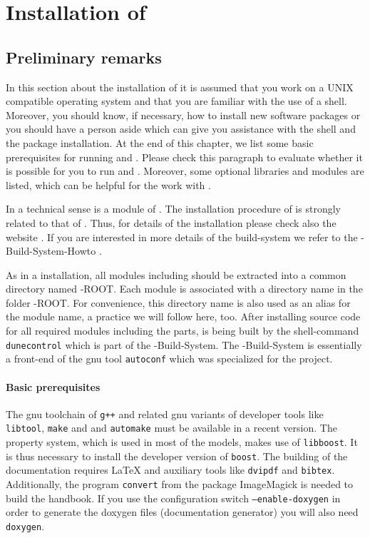 \section{Installation of \Dumux} \label{install}
\subsection{Preliminary remarks}

In this section about the installation of \Dumux it is assumed that you work on a UNIX compatible operating system and that you are familiar with the use of a shell. Moreover, you should know,  if necessary, how to install new software packages or you should have a person aside which can give you assistance with the shell and the package installation. At the end of this chapter, we list some basic prerequisites for running \Dune and \Dumux. Please check this paragraph to evaluate whether it is possible for you to run \Dune and \Dumux. Moreover, some optional libraries and modules are listed, which can be helpful for the work with \Dumux. 

In a technical sense \Dumux is a module of \Dune. The installation procedure of \Dumux is strongly related to 
that of \Dune. Thus, for details of the installation please check also the {\Dune} website \cite{DUNE-HP}. If you are interested in more details of the build-system we refer to the {\Dune}-Build-System-Howto \cite{DUNE-HP}.

As in a \Dune installation, all \Dune modules including \Dumux should be extracted into a common directory named {\Dune}-ROOT. Each \Dune module is associated with a directory name in the folder {\Dune}-ROOT. For convenience, this directory name is  also used as an alias for the module name, a practice we will follow here, too. After installing source code for all required \Dune modules including the \Dumux parts, \Dune is being built by the shell-command \texttt{dunecontrol} which is part of the {\Dune}-Build-System. The {\Dune}-Build-System is essentially a front-end of the gnu tool \texttt{autoconf} which was specialized for the \Dune project.

\paragraph{Basic prerequisites} \label{prerequisites}
The gnu toolchain of \texttt{g++}  and related gnu variants of developer tools like \texttt{libtool}, \texttt{make} and
and \texttt{automake} must be available in a recent version. The \Dumux property system, which is used in most of the models, makes use of \texttt{libboost}. It is thus necessary to install the developer version of \texttt{boost}. The building of the documentation requires LaTeX and auxiliary tools like \texttt{dvipdf} and \texttt{bibtex}. Additionally, the program \texttt{convert} from the package ImageMagick is needed to build the handbook.  If you use the configuration switch \texttt{--enable-doxygen} in order to generate the doxygen files (documentation generator) you will also need \texttt{doxygen}.

